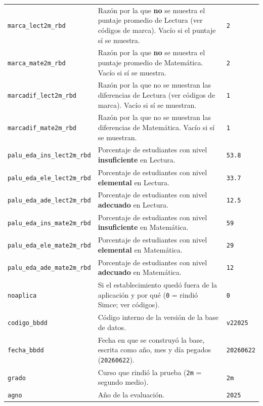 \documentclass[10.5pt]{article}
\begin{document}
\begin{xltabular}{\linewidth}{@{}p{4.5cm} >{\raggedright\arraybackslash}X p{3.4cm}@{}}
\texttt{marca\_\allowbreak{}lect2m\_\allowbreak{}rbd} & Razón por la que \textbf{no} se muestra el puntaje promedio de Lectura (ver códigos de marca). Vacío si el puntaje sí se muestra. & \texttt{2} \\
\texttt{marca\_\allowbreak{}mate2m\_\allowbreak{}rbd} & Razón por la que \textbf{no} se muestra el puntaje promedio de Matemática. Vacío si sí se muestra. & \texttt{2} \\
\texttt{marcadif\_\allowbreak{}lect2m\_\allowbreak{}rbd} & Razón por la que no se muestran las diferencias de Lectura (ver códigos de marca). Vacío si sí se muestran. & \texttt{1} \\
\texttt{marcadif\_\allowbreak{}mate2m\_\allowbreak{}rbd} & Razón por la que no se muestran las diferencias de Matemática. Vacío si sí se muestran. & \texttt{1} \\
\texttt{palu\_\allowbreak{}eda\_\allowbreak{}ins\_\allowbreak{}lect2m\_\allowbreak{}rbd} & Porcentaje de estudiantes con nivel \textbf{insuficiente} en Lectura. & \texttt{53.8} \\
\texttt{palu\_\allowbreak{}eda\_\allowbreak{}ele\_\allowbreak{}lect2m\_\allowbreak{}rbd} & Porcentaje de estudiantes con nivel \textbf{elemental} en Lectura. & \texttt{33.7} \\
\texttt{palu\_\allowbreak{}eda\_\allowbreak{}ade\_\allowbreak{}lect2m\_\allowbreak{}rbd} & Porcentaje de estudiantes con nivel \textbf{adecuado} en Lectura. & \texttt{12.5} \\
\texttt{palu\_\allowbreak{}eda\_\allowbreak{}ins\_\allowbreak{}mate2m\_\allowbreak{}rbd} & Porcentaje de estudiantes con nivel \textbf{insuficiente} en Matemática. & \texttt{59} \\
\texttt{palu\_\allowbreak{}eda\_\allowbreak{}ele\_\allowbreak{}mate2m\_\allowbreak{}rbd} & Porcentaje de estudiantes con nivel \textbf{elemental} en Matemática. & \texttt{29} \\
\texttt{palu\_\allowbreak{}eda\_\allowbreak{}ade\_\allowbreak{}mate2m\_\allowbreak{}rbd} & Porcentaje de estudiantes con nivel \textbf{adecuado} en Matemática. & \texttt{12} \\
\texttt{noaplica} & Si el establecimiento quedó fuera de la aplicación y por qué (\texttt{0} = rindió Simce; ver códigos). & \texttt{0} \\
\texttt{codigo\_\allowbreak{}bbdd} & Código interno de la versión de la base de datos. & \texttt{v22025} \\
\texttt{fecha\_\allowbreak{}bbdd} & Fecha en que se construyó la base, escrita como año, mes y día pegados (\texttt{20260622}). & \texttt{20260622} \\
\texttt{grado} & Curso que rindió la prueba (\texttt{2m} = segundo medio). & \texttt{2m} \\
\texttt{agno} & Año de la evaluación. & \texttt{2025} \\
\end{xltabular}
\end{document}
